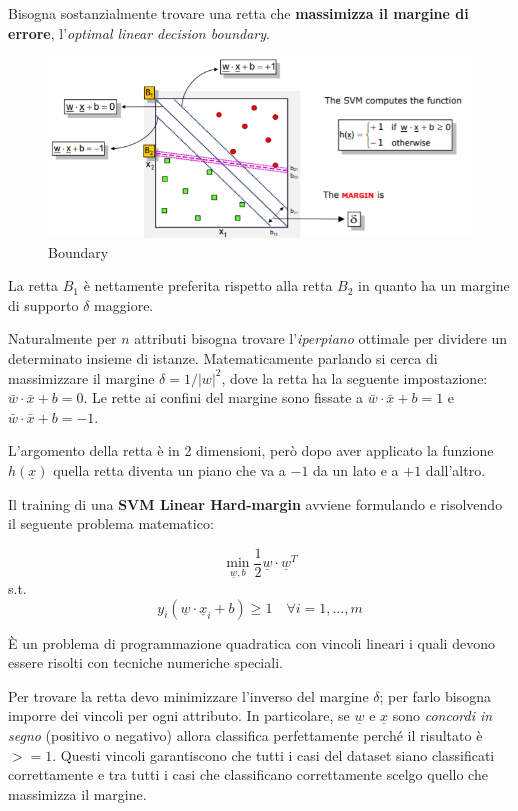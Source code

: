 Bisogna sostanzialmente trovare una retta che \textbf{massimizza il margine di errore}, l'\textit{optimal linear decision boundary}. 

\begin{figure}[H]
	\hspace{-0.5cm}
	\includegraphics[height=0.45 \linewidth]{classification/pict/svm_boundary.png}
	\caption{Boundary}
\end{figure}

La retta $B_1$ è nettamente preferita rispetto alla retta $B_2$ in quanto ha un margine di supporto $\delta$ maggiore. 

Naturalmente per $n$ attributi bisogna trovare l'\textit{iperpiano} ottimale per dividere un determinato insieme di istanze. Matematicamente parlando si cerca di massimizzare il margine $\delta = 1 / |w|^2$, dove la retta ha la seguente impostazione: $\bar{w} \cdot \bar{x} + b = 0$. Le rette ai confini del margine sono fissate a $\bar{w} \cdot \bar{x} + b = 1$ e $\bar{w} \cdot \bar{x} + b = -1$. 

L'argomento della retta è in 2 dimensioni, però dopo aver applicato la funzione $h(\underline{x})$ quella retta diventa un piano che va a $-1$ da un lato e a $+1$ dall'altro.

Il training di una \textbf{SVM Linear Hard-margin} avviene formulando e risolvendo il seguente problema matematico: 

\[ \min_{\underline{w},b} \frac{1}{2}\underline{w} \cdot \underline{w}^T \]
\qquad s.t.
\[ y_i (\underline{w} \cdot \underline{x}_i + b) \ge 1 \quad \forall i = 1, ..., m\]

È un problema di programmazione quadratica con vincoli lineari i quali devono essere risolti con tecniche numeriche speciali.

Per trovare la retta devo minimizzare l'inverso del margine $\delta$; per farlo bisogna imporre dei vincoli per ogni attributo. In particolare,  se $\underline{w}$ e $\underline{x}$ sono \textit{concordi in segno} (positivo o negativo) allora classifica perfettamente perché il risultato è $>= 1$. Questi vincoli garantiscono che tutti i casi del dataset siano classificati correttamente e tra tutti i casi che classificano correttamente scelgo quello che massimizza il margine. 

